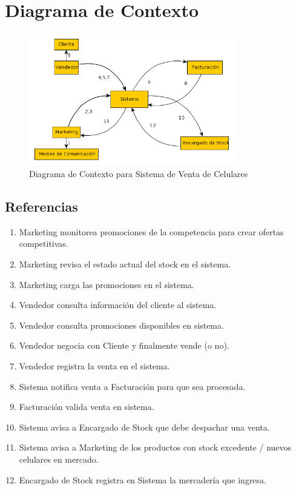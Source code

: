 \section{Diagrama de Contexto}

\begin{figure}[h!]
  	\centering
	\includegraphics[width=0.8\textwidth]{./imagenes/diagrama_contexto.png}
	\caption{Diagrama de Contexto para Sistema de Venta de Celulares}
\end{figure}

\subsection{Referencias}

\begin{enumerate}

	\item Marketing monitorea promociones de la competencia para crear ofertas competitivas.
	 
	\item Marketing revisa el estado actual del stock en el sistema.
	 
	\item Marketing carga las promociones en el sistema.
	 
	\item Vendedor consulta información del cliente al sistema.
	 
	\item Vendedor consulta promociones disponibles en sistema.
	 
	\item Vendedor negocia con Cliente y finalmente vende (o no).
	 
	\item Vendedor registra la venta en el sistema.
	 
	\item Sistema notifica venta a Facturación para que sea procesada.
	 
	\item Facturación valida venta en sistema.
	 
	\item Sistema avisa a Encargado de Stock que debe despachar una venta.

	\item Sistema avisa a Marketing de los productos con stock excedente / nuevos celulares en mercado.

	\item Encargado de Stock registra en Sistema la mercadería que ingresa.

\end{enumerate}
